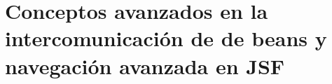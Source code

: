 \chapter{Conceptos avanzados en la intercomunicaci\'{o}n de de beans y navegaci\'{o}n avanzada en JSF}

 
